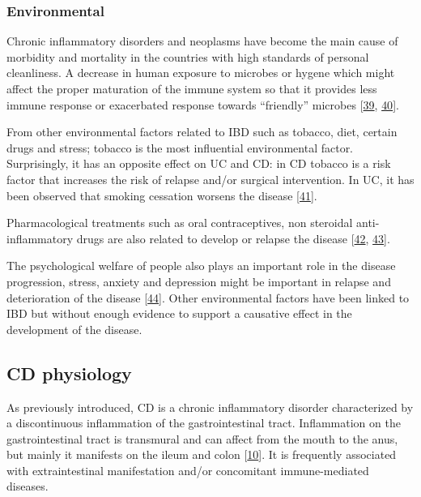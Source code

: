 \documentclass[
  12pt,
  a4paper,
  twoside,
  openright]{book}
\begin{document}
\hypertarget{environmental}{%
\subsubsection{Environmental}\label{environmental}}

Chronic inflammatory disorders and neoplasms have become the main cause of morbidity and mortality in the countries with high standards of personal cleanliness.
A decrease in human exposure to microbes or hygene which might affect the proper maturation of the immune system so that it provides less immune response or exacerbated response towards ``friendly'' microbes {[}\protect\hyperlink{ref-strachan1989}{39}, \protect\hyperlink{ref-scudellari2017}{40}{]}.

From other environmental factors related to IBD such as tobacco, diet, certain drugs and stress; tobacco is the most influential environmental factor.
Surprisingly, it has an opposite effect on UC and CD: in CD tobacco is a risk factor that increases the risk of relapse and/or surgical intervention.
In UC, it has been observed that smoking cessation worsens the disease {[}\protect\hyperlink{ref-thomas1998}{41}{]}.

Pharmacological treatments such as oral contraceptives, non steroidal anti-inflammatory drugs are also related to develop or relapse the disease {[}\protect\hyperlink{ref-cornish2008}{42}, \protect\hyperlink{ref-kaufmann1987}{43}{]}.

The psychological welfare of people also plays an important role in the disease progression, stress, anxiety and depression might be important in relapse and deterioration of the disease {[}\protect\hyperlink{ref-bitton2008}{44}{]}.
Other environmental factors have been linked to IBD but without enough evidence to support a causative effect in the development of the disease.

\hypertarget{CD}{%
\subsection{CD physiology}\label{CD}}

As previously introduced, CD is a chronic inflammatory disorder characterized by a discontinuous inflammation of the gastrointestinal tract.
Inflammation on the gastrointestinal tract is transmural and can affect from the mouth to the anus, but mainly it manifests on the ileum and colon {[}\protect\hyperlink{ref-demattos2015}{10}{]}.
It is frequently associated with extraintestinal manifestation and/or concomitant immune-mediated diseases.
\end{document}

